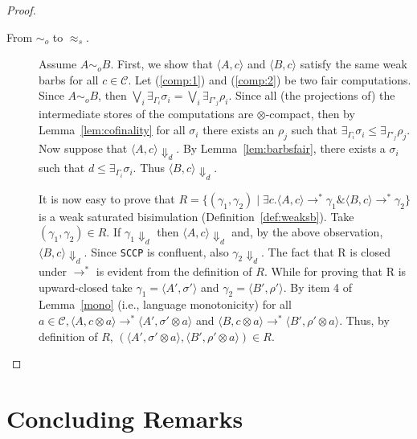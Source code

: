 \documentclass{llncs}
\newcommand{\SCCP}{\texttt{SCCP}\xspace}
\begin{document}
\begin{proof}
\begin{description}
		\item[From $\sim_o$ to $\approx_{\mathit{s}}$.] Assume $A \sim_o B$. First, we show that $\langle A, c\rangle$ and $\langle B, c\rangle$ satisfy the same weak barbs  for all $c \in \mathcal{C}$. Let (\ref{comp:1}) and (\ref{comp:2}) be two fair computations. Since $A \sim_o B$, then $\bigvee_i \exists_{\Gamma_i} \sigma_i = \bigvee_i \exists_{\Gamma'_j} \rho_i$. Since all (the projections of) the intermediate stores of the computations are $\otimes$-compact,
		then by Lemma~\ref{lem:cofinality} for all $\sigma_i$ there exists an $\rho_j$ such that $\exists_{\Gamma_i} \sigma_i \leq \exists_{\Gamma'_j} \rho_j$. 
		Now suppose that $\langle A, c \rangle \Downarrow_d$. By Lemma~\ref{lem:barbsfair}, 
		there exists a $\sigma_i$ 
		such that $d \leq \exists_{\Gamma_i} \sigma_i$. Thus 
		$\langle B, c\rangle \Downarrow_d$.
		
		It is now easy to prove that
		$R = \{(\gamma_1, \gamma_2) \mid \exists c. \langle A, c \rangle \longrightarrow^* \gamma_1 \& \langle B, c\rangle \longrightarrow^* \gamma_2\}$
		is a weak saturated bisimulation (Definition~\ref{def:weaksb}). Take $(\gamma_1 , \gamma_2 ) \in R$.
		If $\gamma_1 \Downarrow_d$ then $\langle A, c \rangle \Downarrow_d$ and, by the above observation, $\langle B, c\rangle \Downarrow_d$. Since \SCCP is
		confluent, also $\gamma_2 \Downarrow_d$.
		The fact that R is closed under $\longrightarrow^*$ is evident from the definition of $R$. While
		for proving that R is upward-closed take $\gamma_1 = \langle A', \sigma'\rangle$ and $\gamma_2 = \langle B', \rho'\rangle$. By item 4 of Lemma~\ref{mono} (i.e., language monotonicity)
		for all $a \in \mathcal{C}, \langle A, c \otimes a\rangle \longrightarrow^* \langle A', \sigma' \otimes a \rangle$ and $\langle B, c \otimes a\rangle \longrightarrow^* \langle B', \rho'  \otimes a \rangle$. Thus, by definition of $R$, $(\langle A',\sigma' \otimes a \rangle, \langle B',\rho' \otimes a\rangle) \in R$.
	\end{description} 
\end{proof}

\section{Concluding Remarks}\label{sec:conclusion}


\end{document}
